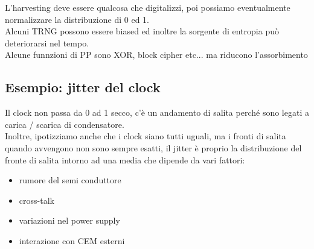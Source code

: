 \documentclass[oneside, 12pt]{extbook}
\begin{document}
L'harvesting deve essere qualcosa che digitalizzi, poi possiamo eventualmente normalizzare la distribuzione di 0 ed 1.
\\Alcuni TRNG possono essere biased ed inoltre la sorgente di entropia può deteriorarsi nel tempo.
\\Alcune funnzioni di PP sono XOR, block cipher etc... ma riducono l'assorbimento

\subsection{Esempio: jitter del clock}
Il clock non passa da 0 ad 1 secco, c'è un andamento di salita perché sono legati a carica / scarica di condensatore.
\\Inoltre, ipotizziamo anche che i clock siano tutti uguali, ma i fronti di salita quando avvengono  non sono sempre esatti, il jitter è proprio la distribuzione del fronte di salita intorno ad una media che dipende da vari fattori:
\begin{itemize}
	\item rumore del semi conduttore
	\item cross-talk
	\item variazioni nel power supply
	\item interazione con CEM esterni
\end{itemize}
\end{document}
